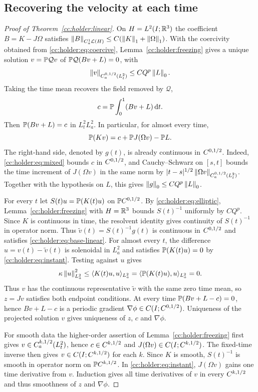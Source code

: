 \subsection{Recovering the velocity at each time}
\begin{proof}[Proof of Theorem~\ref{cc:holder:linear}]
On $H=L^2(I;\mathbb R^3)$ the coefficient $B=K-J\Omega$ satisfies
$\left\lVert B\right\rVert_{C^1_a\mathcal L(H)}\le C(\left\lVert K\right\rVert_1+\left\lVert\Omega\right\rVert_1)$.
With the coercivity obtained from \eqref{cc:holder:eq:coercive},
Lemma~\ref{cc:holder:freezing} gives a unique solution
$v=\mathbb P\mathcal Qv$ of $\mathbb P\mathcal Q(Bv+L)=0$, with
\begin{equation}\label{cc:holder:eq:mixed}
 \left\lVert v\right\rVert_{C^{0,1/2}_a(L^2_t)}\le C Q^{p}\left\lVert L\right\rVert_0.
\end{equation}
Taking the time mean recovers the field removed by $\mathcal Q$,
\[
 c=\mathbb P\int_0^1(Bv+L)\,\mathrm d t .
\]
Then $\mathbb P(Bv+L)=c$ in $L^2_t L^2_a$. In particular, for almost every time,
\begin{equation}\label{cc:holder:eq:instant}
 \mathbb P(Kv)=c+\mathbb P J(\Omega v)-\mathbb P L.
\end{equation}
The right-hand side, denoted by $g(t)$, is already continuous in
$C^{0,1/2}$. Indeed, \eqref{cc:holder:eq:mixed} bounds $c$ in
$C^{0,1/2}$, and Cauchy--Schwarz on $[s,t]$ bounds the time increment
of $J(\Omega v)$ in the same norm by
$|t-s|^{1/2}\left\lVert\Omega v\right\rVert_{C^{0,1/2}_a(L^2_t)}$.
Together with the hypothesis on $L$, this gives $\left\lVert g\right\rVert_0\le CQ^p\left\lVert L\right\rVert_0$.

For every $t$ let $S(t)u=\mathbb P(K(t)u)$ on $\mathbb PC^{0,1/2}$.
By \eqref{cc:holder:eq:elliptic}, Lemma~\ref{cc:holder:freezing} with
$H=\mathbb R^3$ bounds $S(t)^{-1}$ uniformly by $CQ^p$. Since $K$ is continuous
in time, the resolvent identity gives continuity of $S(t)^{-1}$ in
operator norm. Thus $\widetilde v(t)=S(t)^{-1}g(t)$ is continuous in
$C^{0,1/2}$ and satisfies \eqref{cc:holder:eq:base-linear}.
For almost every $t$, the difference $u=v(t)-\widetilde v(t)$ is
solenoidal in $L^2_a$ and satisfies $\mathbb P(K(t)u)=0$ by
\eqref{cc:holder:eq:instant}. Testing against $u$ gives
\[
 \kappa\left\lVert u\right\rVert_{L^2_a}^2\le\langle K(t)u,u\rangle_{L^2_a}
 =\langle \mathbb P(K(t)u),u\rangle_{L^2_a}=0 .
\]
Thus $v$ has the continuous representative $\widetilde v$ with the same
zero time mean, so $z=Jv$ satisfies both endpoint conditions. At every
time $\mathbb P(Bv+L-c)=0$, hence $Bv+L-c$ is a periodic gradient
$\nabla\phi\in C(I;C^{0,1/2})$. Uniqueness of the projected solution
$v$ gives uniqueness of $z$, $c$ and $\nabla\phi$.

For smooth data the higher-order assertion of Lemma~\ref{cc:holder:freezing}
first gives $v\in C^{k,1/2}_a(L^2_t)$, hence $c\in C^{k,1/2}$ and
$J(\Omega v)\in C(I;C^{k,1/2})$. The fixed-time inverse then gives
$v\in C(I;C^{k,1/2})$ for each $k$. Since $K$ is smooth, $S(t)^{-1}$
is smooth in operator norm on $\mathbb PC^{k,1/2}$. In
\eqref{cc:holder:eq:instant}, $J(\Omega v)$ gains one time derivative
from $v$. Induction gives all time derivatives of $v$ in every $C^{k,1/2}$
and thus smoothness of $z$ and $\nabla\phi$.
\end{proof}
